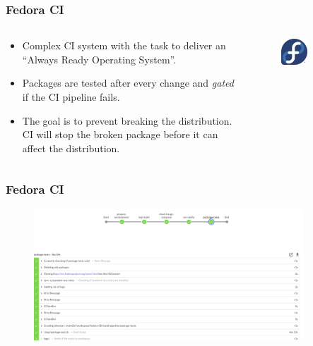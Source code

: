 \documentclass[aspectratio=169]{beamer}
\begin{document}
\begin{frame}
	\frametitle{Fedora CI}
	
	\begin{columns}
\begin{column}{0.6\textwidth}
	\begin{block}{}
		\begin{itemize}
			\item Complex CI system with the task to deliver an ``Always Ready Operating System''.
			\item Packages are tested after every change and \emph{gated} if the CI pipeline fails.
			\item The goal is to prevent breaking the distribution. CI will stop the broken package before it can affect the distribution.
		\end{itemize}
	\end{block}
\end{column}
\begin{column}{0.4\textwidth}
	\begin{figure}[ht!]
	\begin{center}
  	  \includegraphics[width=0.5\textwidth]{img/fedora.png}
	\end{center}
	\end{figure}
\end{column}
\end{columns}
\end{frame}

\begin{frame}
	\frametitle{Fedora CI}
	\begin{figure}[ht!]
	\begin{center}
  	  \includegraphics[width=0.9\textwidth]{img/fedora-ci-1.png}
	\end{center}
	\end{figure}
\end{frame}
\end{document}

